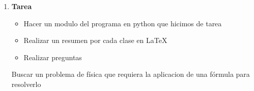 \documentclass[letterpaper, 12pt, oneside]{article}%
\begin{document}
\begin{enumerate}
\begin{enumerate}
\begin{enumerate}
			\end{enumerate}
			
		\end{enumerate}
	\item \textbf{Tarea}
		\begin{itemize}
			\item Hacer un modulo del programa en python que hicimos de tarea
			\item Realizar un resumen por cada clase en LaTeX
			\item Realizar preguntas
			
		\end{itemize}
	Buscar un problema de física que requiera la aplicacion de una fórmula para resolverlo
		
	
\end{enumerate}%
	
\end{document}
